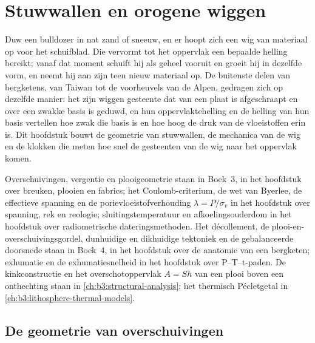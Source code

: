 \chapter{Stuwwallen en orogene wiggen}\label{ch:b3:orogenic-wedges}

Duw een bulldozer in nat zand of sneeuw, en er hoopt zich een wig van materiaal op
voor het schuifblad. Die vervormt tot het oppervlak een bepaalde helling bereikt;
vanaf dat moment schuift hij als geheel vooruit en groeit hij in dezelfde vorm,
en neemt hij aan zijn teen nieuw materiaal op. De buitenste delen van bergketens, van
Taiwan tot de voorheuvels van de Alpen, gedragen zich op dezelfde manier: het zijn wiggen
gesteente dat van een plaat is afgeschraapt en over een zwakke basis is geduwd, en hun
oppervlaktehelling en de helling van hun basis vertellen hoe zwak die basis is en hoe hoog de
druk van de vloeistoffen erin is. Dit hoofdstuk bouwt de geometrie van stuwwallen,
de mechanica van de wig en de klokken die meten hoe snel de gesteenten
van de wig naar het oppervlak komen.

\begin{recall}
Overschuivingen, vergentie en plooigeometrie staan in Boek~3, in het hoofdstuk over
breuken, plooien en fabrics; het Coulomb-criterium, de wet van Byerlee, de
effectieve spanning en de porievloeistofverhouding $\lambda = P/\sigma_v$ in het
hoofdstuk over spanning, rek en reologie; sluitingstemperatuur en afkoelingsouderdom
in het hoofdstuk over radiometrische dateringsmethoden. Het décollement, de
plooi-en-overschuivingsgordel, dunhuidige en dikhuidige tektoniek en de gebalanceerde
doorsnede staan in Boek~4, in het hoofdstuk over de anatomie van een
bergketen; exhumatie en de exhumatiesnelheid in het hoofdstuk over P--T--t-paden. De
kinkconstructie en het overschotoppervlak $A = Sh$ van een plooi boven een onthechting
staan in \cref{ch:b3:structural-analysis}; het thermisch Pécletgetal in
\cref{ch:b3:lithosphere-thermal-models}.
\end{recall}

\section{De geometrie van overschuivingen}\label{sec:b3:orogenic-wedges:geometry}

